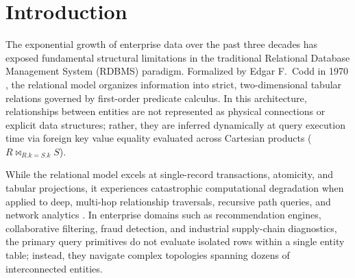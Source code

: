 \documentclass[10pt,twocolumn,letterpaper]{article}
\begin{document}
\section{Introduction}
\label{sec:intro}

The exponential growth of enterprise data over the past three decades has exposed fundamental structural limitations in the traditional Relational Database Management System (RDBMS) paradigm. Formalized by Edgar F.~Codd in 1970 \cite{codd1970}, the relational model organizes information into strict, two-dimensional tabular relations governed by first-order predicate calculus. In this architecture, relationships between entities are not represented as physical connections or explicit data structures; rather, they are inferred dynamically at query execution time via foreign key value equality evaluated across Cartesian products ($R \bowtie_{R.k = S.k} S$).

While the relational model excels at single-record transactions, atomicity, and tabular projections, it experiences catastrophic computational degradation when applied to deep, multi-hop relationship traversals, recursive path queries, and network analytics \cite{angles2008survey}. In enterprise domains such as recommendation engines, collaborative filtering, fraud detection, and industrial supply-chain diagnostics, the primary query primitives do not evaluate isolated rows within a single entity table; instead, they navigate complex topologies spanning dozens of interconnected entities.
\end{document}
